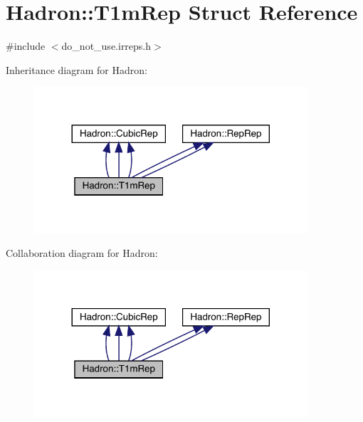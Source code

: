 \hypertarget{structHadron_1_1T1mRep}{}\section{Hadron\+:\+:T1m\+Rep Struct Reference}
\label{structHadron_1_1T1mRep}


{\ttfamily \#include $<$do\+\_\+not\+\_\+use.\+irreps.\+h$>$}



Inheritance diagram for Hadron\+:
\nopagebreak
\begin{figure}[H]
\begin{center}
\leavevmode
\includegraphics[width=288pt]{d7/d39/structHadron_1_1T1mRep__inherit__graph}
\end{center}
\end{figure}


Collaboration diagram for Hadron\+:
\nopagebreak
\begin{figure}[H]
\begin{center}
\leavevmode
\includegraphics[width=288pt]{d4/d67/structHadron_1_1T1mRep__coll__graph}
\end{center}
\end{figure}
